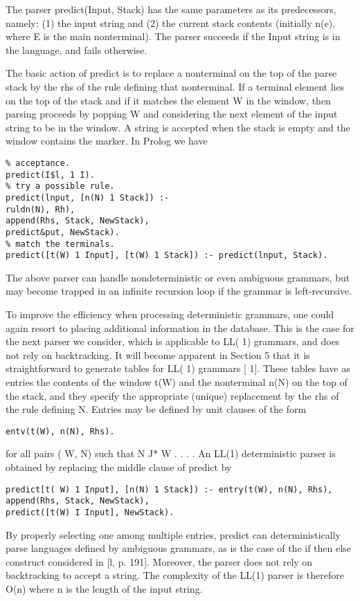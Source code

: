 The parser predict(Input, Stack) has the same parameters as its predecessors,
namely: (1) the input string and (2) the current stack contents (initially n(e),
where E is the main nonterminal). The parser succeeds if the Input string is in
the language, and fails otherwise. 

The basic action of predict is to replace a nonterminal on the top of the parse
stack by the rhs of the rule defining that nonterminal. If a terminal element lies
on the top of the stack and if it matches the element W in the window, then
parsing proceeds by popping W and considering the next element of the input
string to be in the window. A string is accepted when the stack is empty and the
window contains the marker. In Prolog we have 
\begin{verbatim}
% acceptance.
predict(I$l, 1 I).
% try a possible rule.
predict(lnput, [n(N) 1 Stack]) :-
ruldn(N), Rh),
append(Rhs, Stack, NewStack),
predict&put, NewStack).
% match the terminals.
predict([t(W) 1 Input], [t(W) 1 Stack]) :- predict(lnput, Stack). 
\end{verbatim}
The above parser can handle nondeterministic or even ambiguous grammars, but
may become trapped in an infinite recursion loop if the grammar is left-recursive. 

To improve the efficiency when processing deterministic grammars, one could
again resort to placing additional information in the database. This is the case
for the next parser we consider, which is applicable to LL( 1) grammars, and does
not rely on backtracking. It will become apparent in Section 5 that it is straightforward
to generate tables for LL( 1) grammars [ 1]. These tables have as entries
the contents of the window t(W) and the nonterminal n(N) on the top of the
stack, and they specify the appropriate (unique) replacement by the rhs of the
rule defining N. Entries may be defined by unit clauses of the form 
\begin{verbatim}
entv(t(W), n(N), Rhs).
\end{verbatim}
for all pairs ( W, N) such that N J* W . . . . An LL(1) deterministic parser is
obtained by replacing the middle clause of predict by
\begin{verbatim}
predict[t( W) 1 Input], [n(N) 1 Stack]) :- entry(t(W), n(N), Rhs),
append(Rhs, Stack, NewStack),
predict([t(W) I Input], NewStack).   
\end{verbatim}

By properly selecting one among multiple entries, predict can deterministically
parse languages defined by ambiguous grammars, as is the case of the if then
else construct considered in [l, p. 191]. Moreover, the parser does not rely on
backtracking to accept a string. The complexity of the LL(1) parser is therefore
O(n) where n is the length of the input string.

